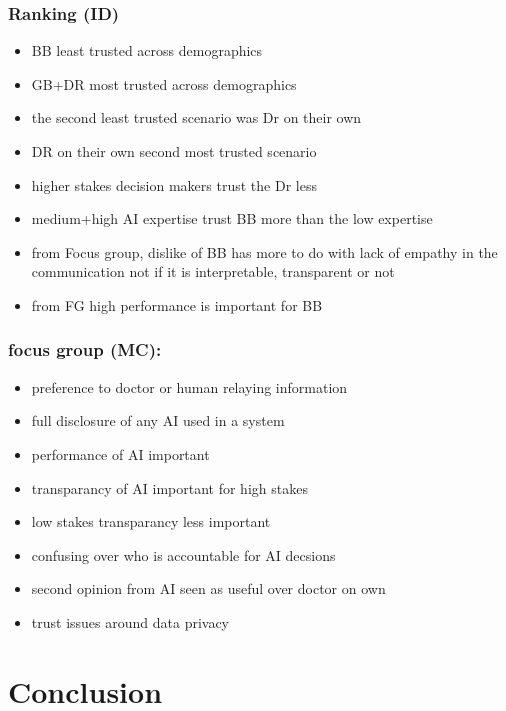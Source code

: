 \documentclass[manuscript,screen,review]{acmart}
\begin{document}

\subsubsection{Ranking (ID)}
\begin{itemize}
    \item BB least trusted across demographics
    \item GB+DR most trusted across demographics
    \item the second least trusted scenario was Dr on their own
    \item DR on their own second most trusted scenario
    \item higher stakes decision makers trust the Dr less
    \item medium+high AI expertise trust BB more than the low expertise
    \item from Focus group, dislike of BB has more to do with lack of empathy in the communication not if it is interpretable, transparent or not
    \item from FG high performance is important for BB
\end{itemize}

\subsubsection{focus group (MC):}
\begin{itemize}
    \item preference to doctor or human relaying information
    \item full disclosure of any AI used in a system
    \item performance of AI important
    \item transparancy of AI important for high stakes
    \item low stakes transparancy less important
    \item confusing over who is accountable for AI decsions
    \item second opinion from AI seen as useful over doctor on own
    \item trust issues around data privacy
\end{itemize}
\section{Conclusion}
\end{document}
